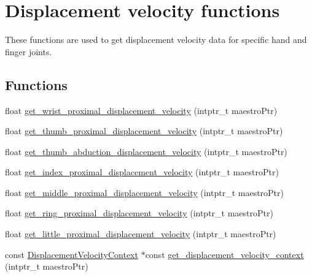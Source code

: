 \hypertarget{group__velocity_access}{}\section{Displacement velocity functions}
\label{group__velocity_access}


These functions are used to get displacement velocity data for specific hand and finger joints.  


\subsection*{Functions}
\begin{DoxyCompactItemize}
\item 
float \hyperlink{group__velocity_access_ga7d809526003fac45ee527df5e4bcb011}{get\+\_\+wrist\+\_\+proximal\+\_\+displacement\+\_\+velocity} (intptr\+\_\+t maestro\+Ptr)
\item 
float \hyperlink{group__velocity_access_ga2a5bef0486e4cb5ef4181ecb3ef78ba5}{get\+\_\+thumb\+\_\+proximal\+\_\+displacement\+\_\+velocity} (intptr\+\_\+t maestro\+Ptr)
\item 
float \hyperlink{group__velocity_access_gad35bee8dbf90f9f0106fd9f5c6efac2c}{get\+\_\+thumb\+\_\+abduction\+\_\+displacement\+\_\+velocity} (intptr\+\_\+t maestro\+Ptr)
\item 
float \hyperlink{group__velocity_access_ga5c587b9748bd964199b596c024d8ed0c}{get\+\_\+index\+\_\+proximal\+\_\+displacement\+\_\+velocity} (intptr\+\_\+t maestro\+Ptr)
\item 
float \hyperlink{group__velocity_access_ga015bb09a174411f845448f951d4a9000}{get\+\_\+middle\+\_\+proximal\+\_\+displacement\+\_\+velocity} (intptr\+\_\+t maestro\+Ptr)
\item 
float \hyperlink{group__velocity_access_ga4077c76793eb77fdde55eff9b5540806}{get\+\_\+ring\+\_\+proximal\+\_\+displacement\+\_\+velocity} (intptr\+\_\+t maestro\+Ptr)
\item 
float \hyperlink{group__velocity_access_ga1c0fe44ea6caec9d337030a4395759ea}{get\+\_\+little\+\_\+proximal\+\_\+displacement\+\_\+velocity} (intptr\+\_\+t maestro\+Ptr)
\item 
const \hyperlink{struct_displacement_velocity_context}{Displacement\+Velocity\+Context} $\ast$const \hyperlink{group__velocity_access_ga062167111a7cc6f51ced782fd0596042}{get\+\_\+displacement\+\_\+velocity\+\_\+context} (intptr\+\_\+t maestro\+Ptr)
\end{DoxyCompactItemize}


